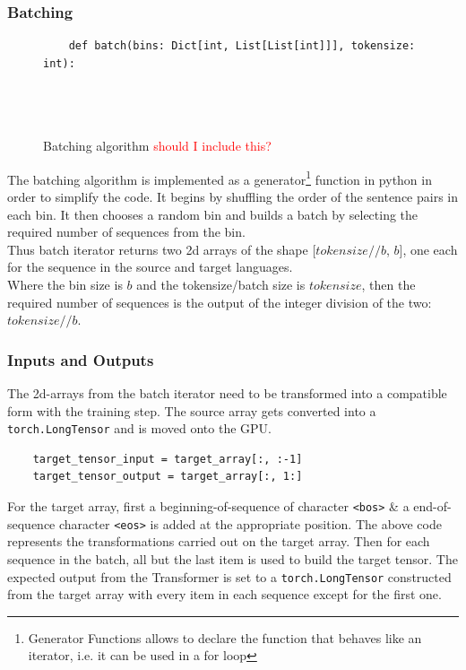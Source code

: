 \documentclass[12pt,a4paper,twoside,openright]{report}
\newcommand{\red}[1]{\textcolor{red}{#1}}
\begin{document}
\subsubsection{Batching}
\begin{figure}
    \centering
    \begin{lstlisting}
    def batch(bins: Dict[int, List[List[int]]], tokensize: int):
        
        
        
    \end{lstlisting}
    \caption{Batching algorithm \red{should I include this?}}
    \label{fig:batching algorithm}
\end{figure} The batching algorithm is implemented as a generator\footnote{Generator Functions allows to declare the function that behaves like an iterator, i.e. it can be used in a for loop} function in python in order to simplify the code. It begins by shuffling the order of the sentence pairs in each bin. It then chooses a random bin and builds a batch by selecting the required number of sequences from the bin. \\
Thus batch iterator returns two 2d arrays of the shape [$tokensize // b$, $b$], one each for the sequence in the source and target languages. \\
Where the bin size is $b$ and the tokensize/batch size is $tokensize$, then the required number of sequences is the output of the integer division of the two: $tokensize//b$. 



\subsubsection{Inputs and Outputs}
The 2d-arrays from the batch iterator need to be transformed into a compatible form with the training step. The source array gets converted into a \lstinline{torch.LongTensor} and is moved onto the GPU. 

\begin{lstlisting}
    target_tensor_input = target_array[:, :-1]
    target_tensor_output = target_array[:, 1:]
\end{lstlisting}

 For the target array, first a beginning-of-sequence of character \lstinline{<bos>} \& a end-of-sequence character \lstinline{<eos>} is added at the appropriate position. The above code represents the transformations carried out on the target array.
Then for each sequence in the batch, all but the last item is used to build the target tensor. 
The expected output from the Transformer is set to a \lstinline{torch.LongTensor} constructed from the target array with every item in each sequence except for the first one.  
\end{document}
